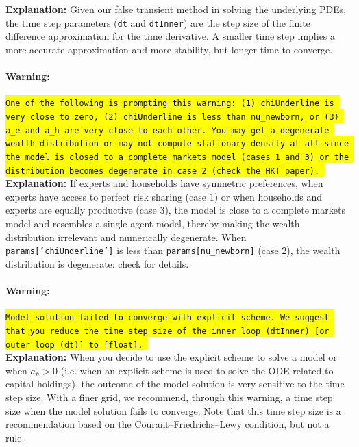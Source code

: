 \documentclass[12pt]{article}
\newcommand{\newbornRateProg}{nu\_newborn\xspace}
\newcommand{\equityConstraintProg}{chiUnderline\xspace}
\begin{document}
\textbf{Explanation:} Given our false transient method in solving the underlying PDEs, the time step parameters (\texttt{dt} and \texttt{dtInner}) are the step size of the finite difference approximation for the time derivative. A smaller time step implies a more accurate approximation and more stability, but longer time to converge.

\paragraph{Warning:} \hl{\texttt{One of the following is prompting this warning: (1) chiUnderline is very close to zero, (2) chiUnderline is less than nu\_newborn, or (3) a\_e and a\_h are very close to each other. You may get a degenerate wealth distribution or may not compute stationary density at all since the model is closed to a complete markets model (cases 1 and 3) or the distribution becomes degenerate in case 2 (check the HKT paper).
}}\\

\textbf{Explanation:} If experts and households have symmetric preferences, when experts have access to perfect risk sharing (case 1) or when households and experts are equally productive (case 3), the model is close to a complete markets model and resembles a single agent model, thereby making the wealth distribution irrelevant and numerically degenerate. When \texttt{params[`\equityConstraintProg']} is less than \texttt{params[\newbornRateProg]} (case 2), the wealth distribution is degenerate: check \cite{HKT} for details.

\paragraph{Warning:} \hl{\texttt{Model solution failed to converge with explicit scheme. We suggest that you reduce the time step size of the inner loop (dtInner) [or outer loop (dt)] to [float].
}}\\

\textbf{Explanation:} When you decide to use the explicit scheme to solve a model or when $a_h > 0$ (i.e. when an explicit scheme is used to solve the ODE related to capital holdings), the outcome of the model solution is very sensitive to the time step size. With a finer grid, we recommend, through this warning,  a time step size when the model solution fails to converge. Note that this time step size is a recommendation based on the Courant–Friedrichs–Lewy condition, but not a rule.
\end{document}
